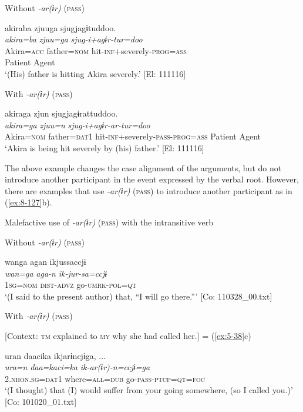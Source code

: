 \ea\label{ex:8-126}
\ea Without \textit{-ar(ɨr)} (\textsc{pass})

{\TM}
\glll  akiraba  zjuuga  sjugjagɨtuddoo.\\
\textit{akira=ba}  \textit{zjuu=ga}  \textit{sjug-i+agɨr-tur=doo}\\
Akira=\textsc{acc}  father=\textsc{nom}  hit-\textsc{inf}+severely-\textsc{prog}=\textsc{ass}\\
      Patient  Agent  \\
\glt ‘(His) father is hitting Akira severely.’ [El: 111116]


\ex With \textit{-ar(ɨr)} (\textsc{pass})

{\TM}
\glll  akiraga  zjun  sjugjagɨrattuddoo.\\
\textit{akira=ga}  \textit{zjuu=n}  \textit{sjug-i+agɨr-ar-tur=doo}\\
Akira=\textsc{nom}  father=\textsc{dat1}  hit-\textsc{inf}+severely-\textsc{pass}-\textsc{prog}=\textsc{ass}
      Patient  Agent  \\
\glt ‘Akira is being hit severely by (his) father.’ [El: 111116]
\z
\z

  The above example changes the case alignment of the arguments, but do not introduce another participant in the event expressed by the verbal root. However, there are examples that use \textit{-ar(ɨr)} (\textsc{pass}) to introduce another participant as in (\ref{ex:8-127}b).

\ea\label{ex:8-127}
  Malefactive use of \textit{-ar(ɨr)} (\textsc{pass}) with the intransitive verb

\ea Without \textit{-ar(ɨr)} (\textsc{pass})

{\TM}
\glll  wanga  agan  ikjussaccjɨ\\
\textit{wan=ga}  \textit{aga-n}  \textit{ik-jur-sa=ccjɨ}\\
1\textsc{sg}=\textsc{nom}  \textsc{dist}-\textsc{advz}  go-\textsc{umrk}-\textsc{pol}=\textsc{qt}\\
\glt ‘(I said to the present author) that, “I will go there.”’ [Co: 110328\_00.txt]

\ex With \textit{-ar(ɨr)} (\textsc{pass})

    [Context: \textsc{tm} explained to \textsc{my} why she had called her.] = (\ref{ex:5-38}c)

{\TM}
\glll  uran  daacika  ikjarɨncjɨga, ...\\
\textit{ura=n}  \textit{daa=kaci=ka}  \textit{ik-ar(ɨr)-n=ccjɨ=ga}\\
2.\textsc{nhon}.\textsc{sg}=\textsc{dat1}  where=\textsc{all}=\textsc{dub}  go-\textsc{pass}-\textsc{ptcp}=\textsc{qt}=\textsc{foc}\\
\glt ‘(I thought) that (I) would suffer from your going somewhere, (so I called you.)’ [Co: 101020\_01.txt]
\z
\z

